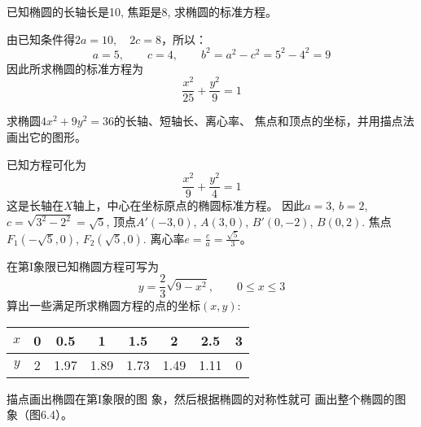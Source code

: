 \begin{figure}[htp]\centering
    \centering
{}
    \caption{}
    \end{figure}


\begin{example}
    已知椭圆的长轴长是10, 焦距是8, 求椭圆的标准方程。
\end{example}

\begin{solution}
    由已知条件得$2a=10,\quad 2c=8$，所以：
\[a=5,\qquad c=4,\qquad b^2=a^2-c^2=5^2-4^2=9\]
因此所求椭圆的标准方程为
\[\frac{x^2}{25}+\frac{y^2}{9}=1\]
\end{solution}

\begin{example}
    求椭圆$4x^2+9y^2=36$的长轴、短轴长、离心率、
焦点和顶点的坐标，并用描点法画出它的图形。
\end{example}

\begin{solution}
    已知方程可化为
    \[\frac{x^2}{9}+\frac{y^2}{4}=1\]
这是长轴在$X$轴上，中心在坐标原点的椭圆标准方程。
因此$a=3$, $b=2$, $c=\sqrt{3^2-2^2}=\sqrt{5}$, 顶点$A'(-3,
0)$, $A(3,0)$, $B'(0,-2)$, $B(0,2)$. 焦点
$F_1(-\sqrt{5},0)$, $F_2(\sqrt{5},0)$. 离心率$e=\frac{c}{a}=\frac{\sqrt{5}}{3}$。

在第I象限已知椭圆方程可写为
\[y=\frac{2}{3}\sqrt{9-x^2},\qquad 0\le x\le 3\]
算出一些满足所求椭圆方程的点的坐标$(x,y)$:
\begin{center}
    \begin{tabular}{cccccccc}
\hline
$x$&0&0.5&1&1.5&2&2.5&3\\
\hline
$y$&2&1.97&1.89&1.73&1.49&1.11&0\\
\hline
    \end{tabular}
\end{center}
描点画出椭圆在第I象限的图
象，然后根据椭圆的对称性就可
画出整个椭圆的图象（图6.4）。
\end{solution}


